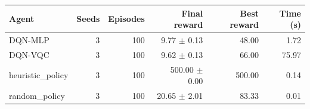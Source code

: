 \begin{tabular}{lrrrrr}
\hline
Agent & Seeds & Episodes & Final reward & Best reward & Time (s) \\
\hline
DQN-MLP & 3 & 100 & 9.77 $\pm$ 0.13 & 48.00 & 1.72 \\
DQN-VQC & 3 & 100 & 9.62 $\pm$ 0.13 & 66.00 & 75.97 \\
heuristic\_policy & 3 & 100 & 500.00 $\pm$ 0.00 & 500.00 & 0.14 \\
random\_policy & 3 & 100 & 20.65 $\pm$ 2.01 & 83.33 & 0.01 \\
\hline
\end{tabular}
